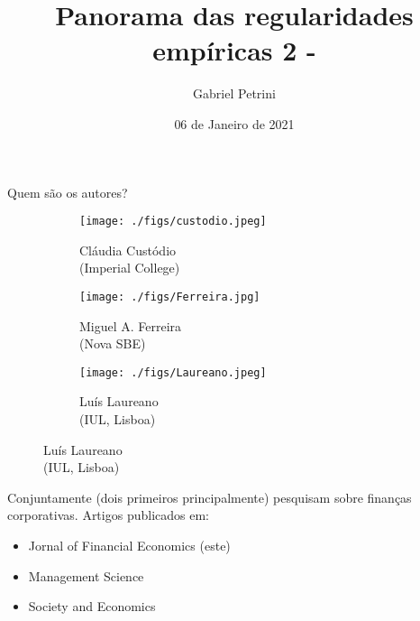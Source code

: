 \documentclass[presentation]{beamer}
\author{Gabriel Petrini}
\date{06 de Janeiro de 2021}
\title{Panorama das regularidades empíricas 2 - \textcite{custodio_2013_Why}}
\begin{document}
\maketitle
\section{}
\label{sec:org893fb00}

\begin{frame}[label={sec:orgbf87cd4}]{Quem são os autores?}
\begin{figure}
\caption{Autores}
\begin{subfigure}{.3\linewidth}
\centering
\texttt{[image: ./figs/custodio.jpeg]}
\caption{Cláudia Custódio\\(Imperial College)}
\end{subfigure}%
\begin{subfigure}{.3\linewidth}
\centering
\texttt{[image: ./figs/Ferreira.jpg]}
\caption{Miguel A. Ferreira\\(Nova SBE)}
\end{subfigure}%
\begin{subfigure}{.3\linewidth}
\centering
\texttt{[image: ./figs/Laureano.jpeg]}
\caption{Luís Laureano\\(IUL, Lisboa)}
\end{subfigure}
\end{figure}


Conjuntamente (dois primeiros principalmente) pesquisam sobre finanças corporativas.
Artigos publicados em:
\begin{itemize}
\item Jornal of Financial Economics (este)
\item Management Science
\item Society and Economics
\end{itemize}
\end{frame}
\end{document}
